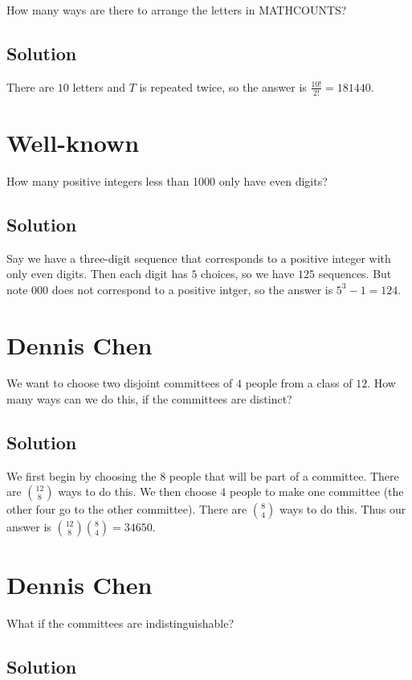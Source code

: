 \documentclass{article}
\begin{document}
How many ways are there to arrange the letters in MATHCOUNTS?

\subsection{Solution}
There are $10$ letters and $T$ is repeated twice, so the answer is $\frac{10!}{2!}=181440.$

\pagebreak\section{Well-known}

How many positive integers less than 1000 only have even digits?

\subsection{Solution}

Say we have a three-digit sequence that corresponds to a positive integer with only even digits. Then each digit has $5$ choices, so we have $125$ sequences. But note $000$ does not correspond to a positive intger, so the answer is $5^3 - 1 = 124.$

\pagebreak\section{Dennis Chen}

We want to choose two disjoint committees of $4$ people from a class of $12.$ How many ways can we do this, if the committees are distinct?
\subsection{Solution}

We first begin by choosing the $8$ people that will be part of a committee. There are $\binom{12}{8}$ ways to do this. We then choose $4$ people to make one committee (the other four go to the other committee). There are $\binom{8}{4}$ ways to do this. Thus our answer is $\binom{12}{8}\binom{8}{4}=34650.$

\pagebreak\section{Dennis Chen}

What if the committees are indistinguishable?

\subsection{Solution}
\end{document}
